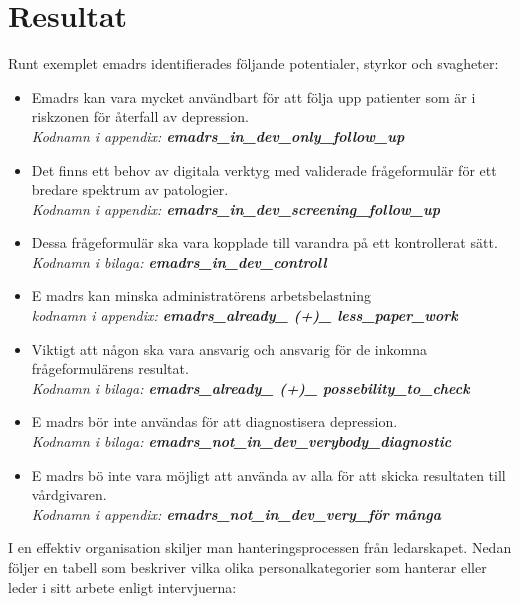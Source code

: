 \documentclass[12pt,a4paper,oneside]{article}
\let\oldcite\cite
\renewcommand*\cite[1]{\textsuperscript{\oldcite{#1}}}
\begin{document}
\section*{Resultat}
Runt exemplet e{\sc madrs} identifierades f{\"o}ljande potentialer, styrkor och svagheter:
\begin{itemize}
\item E{\sc madrs} kan vara mycket anv{\"a}ndbart f{\"o}r att f{\"o}lja upp patienter som {\"a}r i riskzonen f{\"o}r {\aa}terfall av depression. \\{\it Kodnamn i appendix: {\bfseries emadrs\_in\_dev\_only\_follow\_up}}
\item Det finns ett behov av digitala verktyg med validerade fr{\aa}geformul{\"a}r f{\"o}r ett bredare spektrum av patologier. \\{\it Kodnamn i appendix: {\bfseries emadrs\_in\_dev\_screening\_follow\_up}}
\item Dessa fr{\aa}geformul{\"a}r ska vara kopplade till varandra p{\aa} ett kontrollerat s{\"a}tt. \\{\it Kodnamn i bilaga: {\bfseries emadrs\_in\_dev\_controll}}
\item E {\sc madrs} kan minska administrat{\"o}rens arbetsbelastning \\{\it kodnamn i appendix: {\bfseries emadrs\_already\_ (+)\_ less\_paper\_work}}
\item Viktigt att n{\aa}gon ska vara ansvarig och ansvarig f{\"o}r de inkomna fr{\aa}geformul{\"a}rens resultat. \\{\it Kodnamn i bilaga: {\bfseries emadrs\_already\_ (+)\_ possebility\_to\_check}}
\item E {\sc madrs} b{\"o}r inte anv{\"a}ndas f{\"o}r att diagnostisera depression. \\{\it Kodnamn i bilaga: {\bfseries emadrs\_not\_in\_dev\_verybody\_diagnostic}}
\item E {\sc madrs} b{\"o} inte vara m{\"o}jligt att anv{\"a}nda av alla f{\"o}r att skicka resultaten till v{\aa}rdgivaren. \\{\it Kodnamn i appendix: {\bfseries emadrs\_not\_in\_dev\_very\_f{\"o}r m{\aa}nga}}
\end{itemize}
I en effektiv organisation skiljer man hanteringsprocessen fr{\aa}n ledarskapet\cite {leader1}. Nedan f{\"o}ljer en tabell som beskriver vilka olika personalkategorier som hanterar eller leder i sitt arbete enligt intervjuerna:\nopagebreak
\end{document}
